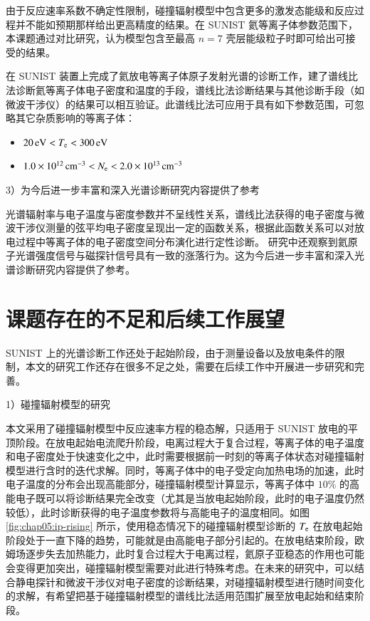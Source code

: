 由于反应速率系数不确定性限制，碰撞辐射模型中包含更多的激发态能级和反应过程并不能如预期那样给出更高精度的结果。在 SUNIST 氦等离子体参数范围下，本课题通过对比研究，认为模型包含至最高 $n=7$ 壳层能级粒子时即可给出可接受的结果。

在 SUNIST 装置上完成了氦放电等离子体原子发射光谱的诊断工作，建了谱线比法诊断氦等离子体电子密度和温度的手段，谱线比法诊断结果与其他诊断手段（如微波干涉仪）的结果可以相互验证。此谱线比法可应用于具有如下参数范围，可忽略其它杂质影响的等离子体：
\begin{itemize}[\hspace{4em}\raisebox{1pt}{\small$\bullet$}]
  \item $20\,{\rm eV}<T_{\rm e}<300\,{\rm eV}$
  \item $1.0\times10^{12}\,{\rm cm}^{-3}<N_{\rm e}<2.0\times10^{13}\,{\rm cm}^{-3}$
\end{itemize}

3）为今后进一步丰富和深入光谱诊断研究内容提供了参考

光谱辐射率与电子温度与密度参数并不呈线性关系，谱线比法获得的电子密度与微波干涉仪测量的弦平均电子密度呈现出一定的函数关系，根据此函数关系可以对放电过程中等离子体的电子密度空间分布演化进行定性诊断。%
研究中还观察到氦原子光谱强度信号与磁探针信号具有一致的涨落行为。这为今后进一步丰富和深入光谱诊断研究内容提供了参考。

\section{课题存在的不足和后续工作展望}
\label{sec:chap06:buzuhezhanwang}

SUNIST 上的光谱诊断工作还处于起始阶段，由于测量设备以及放电条件的限制，本文的研究工作还存在很多不足之处，需要在后续工作中开展进一步研究和完善。

1）碰撞辐射模型的研究

本文采用了碰撞辐射模型中反应速率方程的稳态解，只适用于 SUNIST 放电的平顶阶段。在放电起始电流爬升阶段，电离过程大于复合过程，等离子体的电子温度和电子密度处于快速变化之中，此时需要根据前一时刻的等离子体状态对碰撞辐射模型进行含时的迭代求解。同时，等离子体中的电子受定向加热电场的加速，此时电子温度的分布会出现高能部分，碰撞辐射模型计算显示，等离子体中 $10\%$ 的高能电子既可以将诊断结果完全改变\cite{Sasaki:NIFS:DATA:049}（尤其是当放电起始阶段，此时的电子温度仍然较低），此时诊断获得的电子温度参数将与高能电子的温度相同。如图 \ref{fig:chap05:ip-rising} 所示，使用稳态情况下的碰撞辐射模型诊断的 $T_{\rm e}$ 在放电起始阶段处于一直下降的趋势，可能就是由高能电子部分引起的。在放电结束阶段，欧姆场逐步失去加热能力，此时复合过程大于电离过程，氦原子亚稳态的作用也可能会变得更加突出\cite{Afterglow:1,Afterglow:2}，碰撞辐射模型需要对此进行特殊考虑。在未来的研究中，可以结合静电探针和微波干涉仪对电子密度的诊断结果，对碰撞辐射模型进行随时间变化的求解，有希望把基于碰撞辐射模型的谱线比法适用范围扩展至放电起始和结束阶段。

